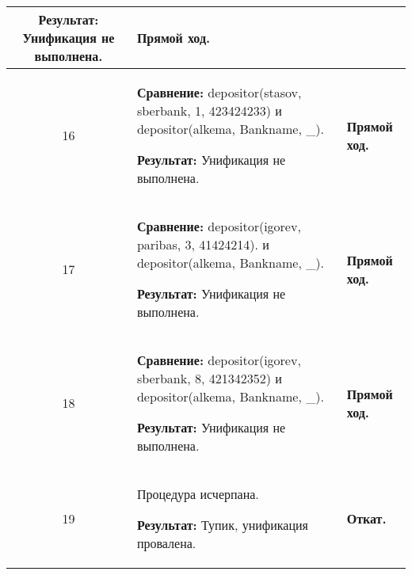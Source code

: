 \begin{longtable}{|c|p{}|p{}|}
    \textbf{Результат:} \newline
    Унификация не выполнена.
                       &
    \textbf{Прямой ход.}
                       \\ \hline

    16
                       &
\textbf{Сравнение:} \newline
  depositor(stasov, sberbank, 1, 423424233)
    \newline и \newline
    depositor(alkema, Bankname, \_).
    \newline

    \textbf{Результат:} \newline
    Унификация не выполнена.
                       &
    \textbf{Прямой ход.}
                       \\ \hline

    17
                       &
\textbf{Сравнение:} \newline
  depositor(igorev, paribas,  3, 41424214).
    \newline и \newline
    depositor(alkema, Bankname, \_).
    \newline

    \textbf{Результат:} \newline
    Унификация не выполнена.
                       &
    \textbf{Прямой ход.}
                       \\ \hline

    18
                       &
\textbf{Сравнение:} \newline
  depositor(igorev, sberbank, 8, 421342352)
    \newline и \newline
    depositor(alkema, Bankname, \_).
    \newline

    \textbf{Результат:} \newline
    Унификация не выполнена.
                       &
    \textbf{Прямой ход.}
                       \\ \hline

    19
                       &
    Процедура исчерпана.
    \newline

    \textbf{Результат:} \newline
    Тупик, унификация провалена.
                       &
    \textbf{Откат.}
    \newline


\end{longtable}
